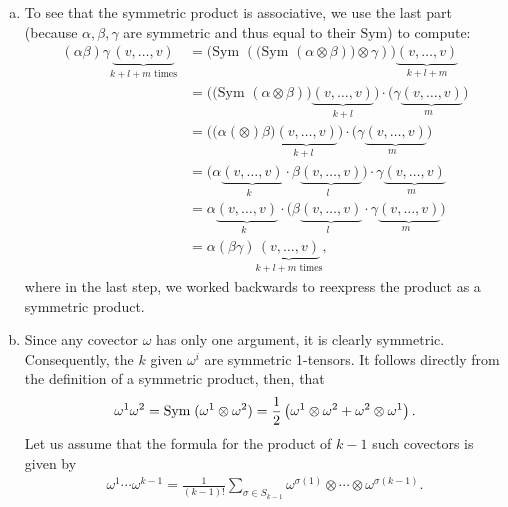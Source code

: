 \documentclass{../../mathnotes}
\begin{document}
\begin{enumerate}[(a)]
    \item To see that the symmetric product is associative, we use the last part (because $\alpha,\beta,\gamma$ are symmetric and thus equal to their $\text{Sym}$) to compute:
        \begin{align*}
            (\alpha\beta)\gamma\underbrace{(v, \dots, v)}_{\text{$k + l + m$ times}}& = \bigg( \text{Sym }\left( \big(\text{Sym }\left( \alpha \otimes \beta \right)\big) \otimes \gamma \right) \bigg) \underbrace{(v, \dots, v)}_{\text{$k + l + m$}} \\
            & = \big( \big( \text{Sym }(\alpha \otimes \beta) \big)\underbrace{(v, \dots, v)}_{\text{$k + l$}} \big)  \cdot \big( \gamma \underbrace{(v, \dots, v)}_{\text{$m$ }} \big) \\
            & = \big( \big(\alpha(\otimes)\beta\big)\underbrace{(v, \dots, v)}_{\text{$k + l$ }} \big) \cdot \big( \gamma\underbrace{(v, \dots, v)}_{\text{$m$ }} \big) \\
            & = \big( \alpha\underbrace{(v, \dots, v)}_{\text{$k$ }} \cdot \beta \underbrace{(v, \dots, v)}_{\text{$l$ }} \big)  \cdot \gamma \underbrace{(v, \dots, v)}_{\text{$m$ }} \\
            & =  \alpha\underbrace{(v, \dots, v)}_{\text{$k$ }} \cdot \big( \beta \underbrace{(v, \dots, v)}_{\text{$l$ }}   \cdot \gamma \underbrace{(v, \dots, v)}_{\text{$m$ }} \big)\\
            & = \alpha(\beta\gamma)\underbrace{(v, \dots, v)}_{\text{$k + l + m$ times}},
        \end{align*}
        where in the last step, we worked backwards to reexpress the product as a symmetric product.
    \item Since any covector $\omega$ has only one argument, it is clearly symmetric. Consequently, the $k$ given $\omega^i$ are
        symmetric 1-tensors. It follows directly from the definition of a symmetric product, then, that
        \begin{align*}
            \omega^1\omega^2=\text{Sym\;}(\omega^1\otimes\omega^2)=\frac{1}{2}\left( \omega^1\otimes\omega^2+\omega^2\otimes\omega^1 \right).
        \end{align*}
        Let us assume that the formula for the product of $k-1$ such covectors is given by
        \begin{align*}
            \omega^1\cdots\omega^{k-1}=\frac{1}{(k-1)!}\sum_{\sigma\in S_{k-1}}\omega^{\sigma(1)}\otimes \cdots\otimes\omega^{\sigma(k-1)}.
        \end{align*}

\end{enumerate}
\end{document}
